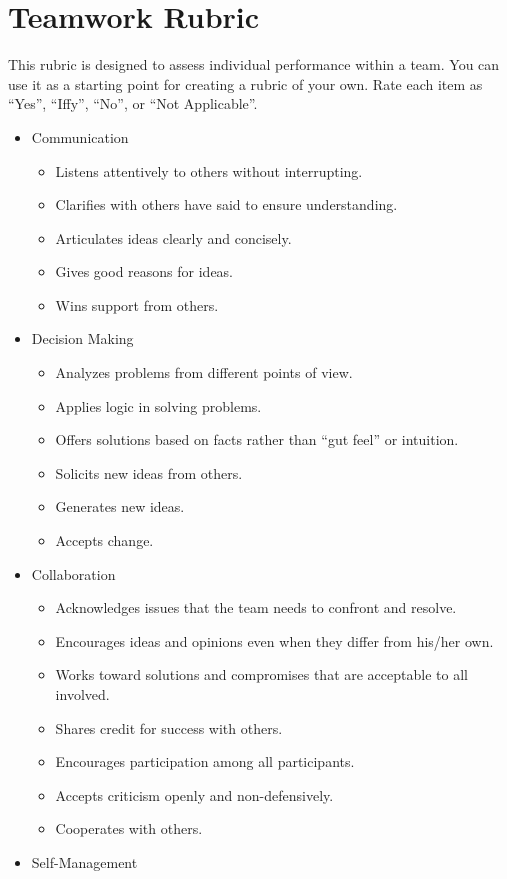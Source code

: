 \chapter{Teamwork Rubric}\label{s:peereval}

This rubric is designed to assess individual performance within a
team. You can use it as a starting point for creating a rubric of
your own. Rate each item as ``Yes'', ``Iffy'', ``No'', or ``Not Applicable''.

\begin{itemize}
\tightlist
\item
  Communication

  \begin{itemize}
  \tightlist
  \item
    Listens attentively to others without interrupting.
  \item
    Clarifies with others have said to ensure understanding.
  \item
    Articulates ideas clearly and concisely.
  \item
    Gives good reasons for ideas.
  \item
    Wins support from others.
  \end{itemize}
\item
  Decision Making

  \begin{itemize}
  \tightlist
  \item
    Analyzes problems from different points of view.
  \item
    Applies logic in solving problems.
  \item
    Offers solutions based on facts rather than ``gut feel'' or intuition.
  \item
    Solicits new ideas from others.
  \item
    Generates new ideas.
  \item
    Accepts change.
  \end{itemize}
\item
  Collaboration

  \begin{itemize}
  \tightlist
  \item
    Acknowledges issues that the team needs to confront and resolve.
  \item
    Encourages ideas and opinions even when they differ from his/her own.
  \item
    Works toward solutions and compromises that are acceptable to all involved.
  \item
    Shares credit for success with others.
  \item
    Encourages participation among all participants.
  \item
    Accepts criticism openly and non-defensively.
  \item
    Cooperates with others.
  \end{itemize}
\item
  Self-Management


\end{itemize}
